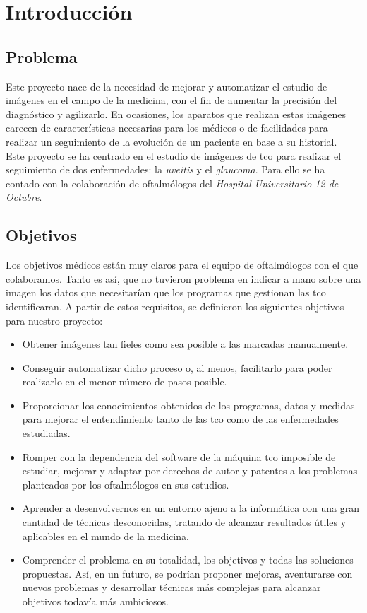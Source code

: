 \chapter{Introducción}
\section{Problema}
Este proyecto nace de la necesidad de mejorar y automatizar el estudio
de imágenes en el campo de la medicina, con el fin de aumentar la
precisión del diagnóstico y agilizarlo. En ocasiones, los aparatos que
realizan estas imágenes carecen de características necesarias para los
médicos o de facilidades para realizar un seguimiento de la evolución
de un paciente en base a su historial.\\
Este proyecto se ha centrado en el estudio de imágenes de \gls{tco}
para realizar el seguimiento de dos enfermedades: la
\emph{\gls{uveitis}} y el \emph{\gls{glaucoma}}. Para ello se ha
contado con la colaboración de oftalmólogos del \emph{Hospital
  Universitario 12 de Octubre}.

\section{Objetivos}
Los objetivos médicos están muy claros  para el equipo de oftalmólogos con el que colaboramos. Tanto es así, 
que no tuvieron problema en indicar a mano sobre una imagen los datos que 
necesitarían que los programas que gestionan las \gls{tco} identificaran. 
A partir de estos requisitos, se definieron los siguientes objetivos para nuestro proyecto:
\begin{itemize}
\item Obtener imágenes tan fieles como sea posible a las marcadas
  manualmente.
\item Conseguir automatizar dicho proceso o, al menos,
  facilitarlo para poder realizarlo en el menor número de pasos posible.
\item Proporcionar los conocimientos obtenidos de los programas, datos y
  medidas para mejorar el entendimiento tanto de las \gls{tco}
  como de las enfermedades estudiadas.
\item Romper con la dependencia del software de la máquina \gls{tco}
  imposible de estudiar, mejorar y adaptar por derechos de autor y
  patentes a los problemas planteados por los oftalmólogos en sus
  estudios.
\item Aprender a desenvolvernos en un entorno ajeno a la informática
  con una gran cantidad de técnicas desconocidas, tratando de alcanzar
  resultados útiles y aplicables en el mundo de la medicina.
\item Comprender el problema en su totalidad, los objetivos y todas
  las soluciones propuestas. Así, en un futuro, se podrían proponer
  mejoras, aventurarse con nuevos problemas y desarrollar técnicas más
  complejas para alcanzar objetivos todavía más ambiciosos.
\end{itemize}
